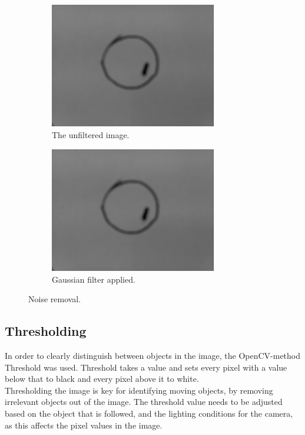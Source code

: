 \documentclass[10pt,a4paper, singlespace]{article}
\begin{document}
\begin{figure}[H]
	\centering
	\begin{subfigure}[b]{0.5\textwidth}
		\includegraphics[width=0.8\textwidth]{without_filter.png}
		\caption{The unfiltered image.}
		\label{fig:unfiltered}
	\end{subfigure}\hfill
	\begin{subfigure}[b]{0.5\textwidth}	
		\includegraphics[width=0.8\textwidth]{gaussian_blur.png}
		\caption{Gaussian filter applied.}
		\label{fig:gaussian}
	\end{subfigure}\hfill
	\caption{Noise removal.}
	\label{fig:fitlering}
\end{figure} 

\subsection{Thresholding}
In order to clearly distinguish between objects in the image, the OpenCV-method Threshold was used. Threshold takes a value and sets every pixel with a value below that to black and every pixel above it to white.\\
Thresholding the image is key for identifying moving objects, by removing irrelevant objects out of the image. The threshold value needs to be adjusted based on the object that is followed, and the lighting conditions for the camera, as this affects the pixel values in the image.\\ 
\end{document}
